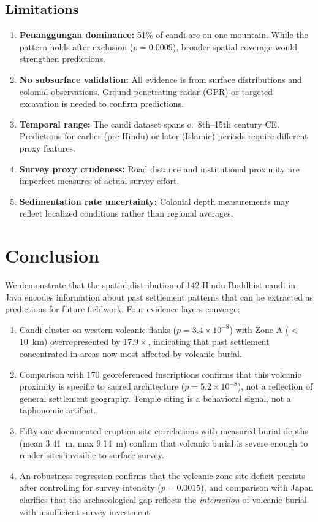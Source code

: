 \documentclass[12pt,a4paper]{article}
\begin{document}
\subsection{Limitations}

\begin{enumerate}
    \item \textbf{Penanggungan dominance:} 51\% of candi are on one mountain. While the pattern holds after exclusion ($p=0.0009$), broader spatial coverage would strengthen predictions.
    \item \textbf{No subsurface validation:} All evidence is from surface distributions and colonial observations. Ground-penetrating radar (GPR) or targeted excavation is needed to confirm predictions.
    \item \textbf{Temporal range:} The candi dataset spans c.\ 8th--15th century CE. Predictions for earlier (pre-Hindu) or later (Islamic) periods require different proxy features.
    \item \textbf{Survey proxy crudeness:} Road distance and institutional proximity are imperfect measures of actual survey effort.
    \item \textbf{Sedimentation rate uncertainty:} Colonial depth measurements may reflect localized conditions rather than regional averages.
\end{enumerate}

\section{Conclusion}

We demonstrate that the spatial distribution of 142 Hindu-Buddhist candi in Java encodes information about past settlement patterns that can be extracted as predictions for future fieldwork. Four evidence layers converge:

\begin{enumerate}
    \item Candi cluster on western volcanic flanks ($p=3.4\times10^{-8}$) with Zone A ($<$10~km) overrepresented by $17.9\times$, indicating that past settlement concentrated in areas now most affected by volcanic burial.
    \item Comparison with 170 georeferenced inscriptions confirms that this volcanic proximity is specific to sacred architecture ($p=5.2\times10^{-8}$), not a reflection of general settlement geography. Temple siting is a behavioral signal, not a taphonomic artifact.
    \item Fifty-one documented eruption-site correlations with measured burial depths (mean 3.41~m, max 9.14~m) confirm that volcanic burial is severe enough to render sites invisible to surface survey.
    \item An robustness regression confirms that the volcanic-zone site deficit persists after controlling for survey intensity ($p=0.0015$), and comparison with Japan clarifies that the archaeological gap reflects the \emph{interaction} of volcanic burial with insufficient survey investment.
\end{enumerate}
\end{document}

